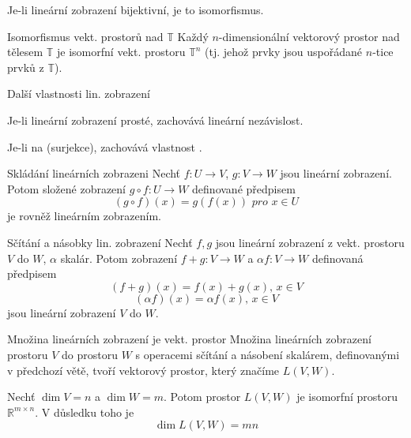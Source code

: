 \begin{veta}
Je-li lineární zobrazení bijektivní, je to isomorfismus.
\end{veta}

\begin{vetaN}{Isomorfismus vekt. prostorů nad $\mathbb{T}$}
Každý $n$-dimensionální vektorový prostor nad tělesem $\mathbb{T}$ je isomorfní vekt. prostoru $\mathbb{T}^n$ (tj. jehož prvky jsou uspořádané $n$-tice prvků z $\mathbb{T}$).
\end{vetaN}

\begin{vetaN}{Další vlastnosti lin. zobrazení}
\begin{penumerate}
    \item Je-li lineární zobrazení prosté, zachovává lineární nezávislost.
    \item Je-li na (surjekce), zachovává vlastnost .
\end{penumerate}
\end{vetaN}

\begin{vetaN}{Skládání lineárních zobrazeni}
Nechť $f: U \rightarrow V$, $g: V \rightarrow W$ jsou lineární zobrazení. Potom složené zobrazení $g \circ f: U \rightarrow W$ definované předpisem
$$ (g \circ f)(x) = g(f(x)) \,\, \textit{pro } x \in U$$
je rovněž lineárním zobrazením.
\end{vetaN}


\begin{vetaN}{Sčítání a násobky lin. zobrazení}
Nechť $f, g$ jsou lineární zobrazení z vekt. prostoru $V$ do $W$, $\alpha$ skalár. Potom zobrazení $f+g: V \rightarrow W$ a $\alpha f: V \rightarrow W$ definovaná předpisem
$$(f+g)(x) = f(x) + g(x), \, x \in V$$
$$(\alpha f)(x) = \alpha f(x), \, x \in V$$
jsou lineární zobrazení $V$ do $W$.
\end{vetaN}

\begin{vetaN}{Množina lineárních zobrazení je vekt. prostor}
Množina lineárních zobrazení prostoru $V$ do prostoru $W$ s operacemi sčítání a násobení skalárem, definovanými v předchozí větě, tvoří vektorový prostor, který značíme $L(V,W)$.
\end{vetaN}

\begin{veta}
Nechť $\dim V=n$ a $\dim W=m$. Potom prostor $L(V,W)$ je isomorfní prostoru $\mathbb{R}^{m\times n}$. V důsledku toho je
$$\dim L(V,W) = mn$$
\end{veta}



